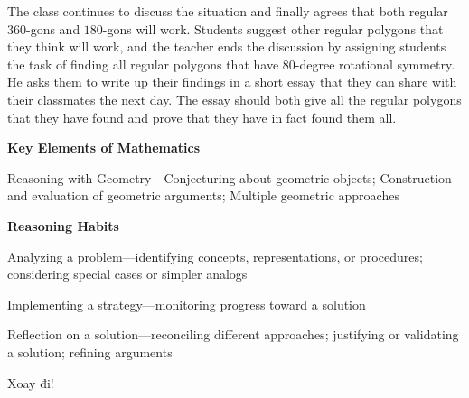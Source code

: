 \documentclass[
  10pt,
  a4paper,
  landscape,
  twoside,
  openany
]{scrbook}
\begin{document}
{The class continues to discuss the situation and finally agrees that both regular $360$-gons and $180$-gons will work. Students suggest other regular polygons that they think will work, and the teacher ends the discussion by assigning students the task of finding all regular polygons that have $80$-degree rotational symmetry. He asks them to write up their findings in a short essay that they can share with their classmates the next day. The essay should both give all the regular polygons that they have found and prove that they have in fact found them all.

\noindent
\textbf{Key Elements of Mathematics}

Reasoning with Geometry---Conjecturing about geometric objects; Construction and evaluation of geometric arguments; Multiple geometric approaches

\noindent
\textbf{Reasoning Habits}


Analyzing a problem---identifying concepts, representations, or procedures; considering special cases or simpler analogs

Implementing a strategy---monitoring progress toward a solution

Reflection on a solution---reconciling different approaches; justifying or validating a solution; refining arguments
}
{Xoay đi!}
\end{document}
